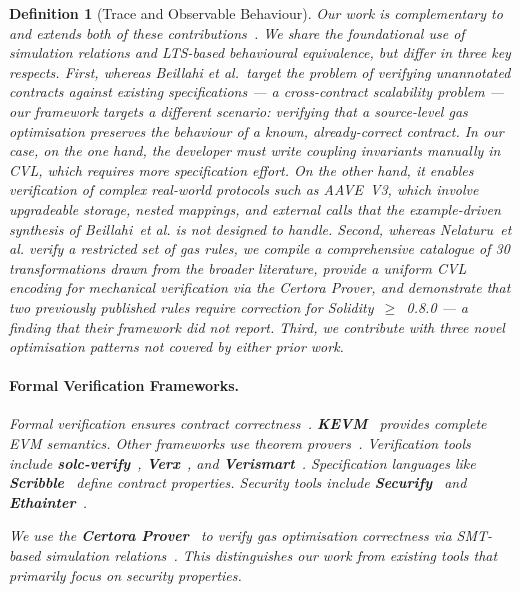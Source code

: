 \documentclass[manuscript,screen,review]{acmart}
\newtheorem{definition}{Definition}
\begin{document}
\begin{definition}[Trace and Observable Behaviour]
Our work is complementary to and extends both of these contributions~\cite{Beillahi2020,NBL21}. We share the foundational use of simulation relations and LTS-based behavioural equivalence, but differ in three key respects. First, whereas Beillahi {\em et al.\/}\ target the problem of verifying unannotated contracts against existing specifications --- a cross-contract scalability problem --- our framework targets a different scenario: verifying that a source-level gas optimisation preserves the behaviour of a known, already-correct contract. In our case, on the one hand, the developer must write coupling invariants manually in CVL, which requires more specification effort. On the other hand, it enables verification of complex real-world protocols such as AAVE~V3, which involve upgradeable storage, nested mappings, and external calls that the example-driven synthesis of Beillahi~\em{et al.\/} is not designed to handle. Second, whereas Nelaturu~\em{et al.\/} verify a restricted set of gas rules, we compile a comprehensive catalogue of 30 transformations drawn from the broader literature, provide a uniform CVL encoding for mechanical verification via the Certora Prover, and demonstrate that two previously published rules require correction for Solidity~$\geq$~0.8.0 --- a finding that their framework did not report. Third, we contribute with three novel optimisation patterns not covered by either prior work.

\paragraph{Formal Verification Frameworks.} Formal verification ensures contract correctness~\cite{OlivieriSpoto2024}. \textbf{KEVM}~\cite{KEVM} provides complete EVM semantics. Other frameworks use theorem provers~\cite{amani2018towards,Cassez2023,hirai2017defining,MarmsolerBrucker2025}. Verification tools include \textbf{solc-verify}~\cite{hajdu2019solc}, \textbf{Verx}~\cite{permenev2020verx}, and \textbf{Verismart}~\cite{so2020verismart}. Specification languages like \textbf{Scribble}~\cite{scribble2020} define contract properties. Security tools include \textbf{Securify}~\cite{tsankov2018securify} and \textbf{Ethainter}~\cite{brent2020ethainter}.

We use the \textbf{Certora Prover}~\cite{certora22,certora2023} to verify gas optimisation correctness via SMT-based simulation relations~\cite{milner1989communication}. This distinguishes our work from existing tools that primarily focus on security properties.


\end{definition}
\end{document}
